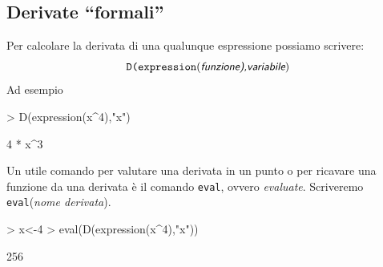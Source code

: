 \documentclass[onecolumn,11pt]{book}
\newcommand{\varia}[1]{\textsl{\textsf{#1}}}
\begin{document}
\subsection{Derivate ``formali''}
Per calcolare la derivata di una qualunque espressione possiamo scrivere:
\begin{equation*}\texttt{D(expression}(\varia{funzione),variabile})
\end{equation*}
Ad esempio

\begin{Schunk}
\begin{Sinput}
> D(expression(x^4),"x")
\end{Sinput}
\begin{Soutput}
4 * x^3
\end{Soutput}
\end{Schunk}
Un utile comando per valutare una derivata in un punto o per  ricavare una funzione da una derivata \`e il comando \texttt{eval}, ovvero {\it evaluate}. Scriveremo \texttt{eval}(\varia{nome derivata}).

\begin{Schunk}
\begin{Sinput}
> x<-4
> eval(D(expression(x^4),"x"))
\end{Sinput}
\begin{Soutput}
[1] 256
\end{Soutput}
\end{Schunk}
\end{document}
